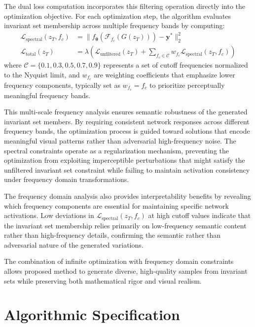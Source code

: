 The dual loss computation incorporates this filtering operation directly into the optimization objective. For each optimization step, the algorithm evaluates invariant set membership across multiple frequency bands by computing:
\begin{align}
\mathcal{L}_{\text{spectral}}(z_T, f_c) &= \|f_{\boldsymbol{\theta}}(\mathcal{F}_{f_c}(G(z_T))) - \mathbf{y^*}\|_2^2\\
\mathcal{L}_{\text{total}}(z_T) &= \lambda \left( \mathcal{L}_{\text{unfiltered}}(z_T) + \sum_{f_c \in \mathcal{C}} w_{f_c} \mathcal{L}_{\text{spectral}}(z_T, f_c) \right)
\end{align}
where $\mathcal{C} = \{0.1, 0.3, 0.5, 0.7, 0.9\}$ represents a set of cutoff frequencies normalized to the Nyquist limit, and $w_{f_c}$ are weighting coefficients that emphasize lower frequency components, typically set as $w_{f_c} = f_c$ to prioritize perceptually meaningful frequency bands.

This multi-scale frequency analysis ensures semantic robustness of the generated invariant set members. By requiring consistent network responses across different frequency bands, the optimization process is guided toward solutions that encode meaningful visual patterns rather than adversarial high-frequency noise. The spectral constraints operate as a regularization mechanism, preventing the optimization from exploiting imperceptible perturbations that might satisfy the unfiltered invariant set constraint while failing to maintain activation consistency under frequency domain transformations.

The frequency domain analysis also provides interpretability benefits by revealing which frequency components are essential for maintaining specific network activations. Low deviations in $\mathcal{L}_{\text{spectral}}(z_T, f_c)$ at high cutoff values indicate that the invariant set membership relies primarily on low-frequency semantic content rather than high-frequency details, confirming the semantic rather than adversarial nature of the generated variations.

The combination of infinite optimization with frequency domain constraints allows proposed method to generate diverse, high-quality samples from invariant sets while preserving both mathematical rigor and visual realism.

\section{Algorithmic Specification}

